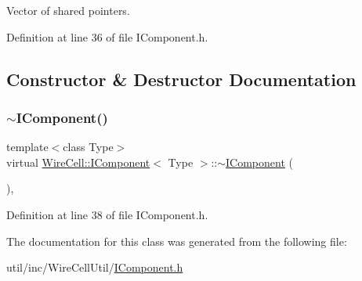 Vector of shared pointers. 



Definition at line 36 of file I\+Component.\+h.



\subsection{Constructor \& Destructor Documentation}
\mbox{\label{class_wire_cell_1_1_i_component_a3415deca75dbbfae924ad33b8cd364d4}} 
\subsubsection{\texorpdfstring{$\sim$\+I\+Component()}{~IComponent()}}
{\footnotesize\ttfamily template$<$class Type$>$ \\
virtual \hyperlink{class_wire_cell_1_1_i_component}{Wire\+Cell\+::\+I\+Component}$<$ Type $>$\+::$\sim$\hyperlink{class_wire_cell_1_1_i_component}{I\+Component} (\begin{DoxyParamCaption}{ }\end{DoxyParamCaption})\hspace{0.3cm}{\ttfamily [inline]}, {\ttfamily [virtual]}}



Definition at line 38 of file I\+Component.\+h.



The documentation for this class was generated from the following file\+:\begin{DoxyCompactItemize}
\item 
util/inc/\+Wire\+Cell\+Util/\hyperlink{_i_component_8h}{I\+Component.\+h}\end{DoxyCompactItemize}
